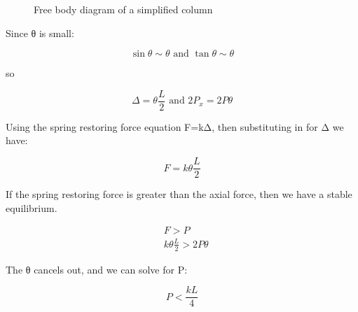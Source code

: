 \documentclass[
  letterpaper,
  DIV=11,
  numbers=noendperiod]{scrreprt}
\theoremstyle{definition}
\theoremstyle{remark}
\begin{document}
\begin{figure}


\caption{\label{fig-15.3}Free body diagram of a simplified column}

\end{figure}%

Since θ is small:

\[
\sin \theta \sim \theta \text { and } \tan \theta \sim \theta
\]

so

\[
\Delta=\theta \frac{L}{2} \text { and } 2 P_x=2 P \theta
\]

Using the spring restoring force equation F=kΔ, then substituting in for
Δ we have:

\[
F=k \theta \frac{L}{2}
\]

If the spring restoring force is greater than the axial force, then we
have a stable equilibrium.

\[
\begin{aligned}
& F>P \\
& k \theta \frac{L}{2}>2 P \theta
\end{aligned}
\]

The θ cancels out, and we can solve for P:

\[
P<\frac{k L}{4}
\]
\end{document}
